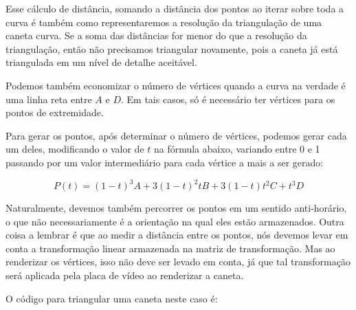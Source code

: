 {Esse cálculo de distância, somando a distância dos pontos ao iterar
sobre toda a curva é também como representaremos a resolução da
triangulação de uma caneta curva. Se a soma das distâncias for menor
do que a resolução da triangulação, então não precisamos triangular
novamente, pois a caneta já está triangulada em um nível de detalhe
aceitável.

Podemos também economizar o número de vértices quando a curva na
verdade é uma linha reta entre $A$ e $D$. Em tais casos, só é
necessário ter vértices para os pontos de extremidade.

Para gerar os pontos, após determinar o número de vértices, podemos
gerar cada um deles, modificando o valor de $t$ na fórmula abaixo,
variando entre 0 e 1 passando por um valor intermediário para cada
vértice a mais a ser gerado:

$$
P(t) = (1-t)^3A + 3(1-t)^2tB + 3(1-t)t^2C + t^3D
$$

Naturalmente, devemos também percorrer os pontos em um sentido
anti-horário, o que não necessariamente é a orientação na qual eles
estão armazenados. Outra coisa a lembrar é que ao medir a distância
entre os pontos, nós devemos levar em conta a transformação linear
armazenada na matriz de transformação. Mas ao renderizar os vértices,
isso não deve ser levado em conta, já que tal transformação será
aplicada pela placa de vídeo ao renderizar a caneta.

O código para triangular uma caneta neste caso é:

}
